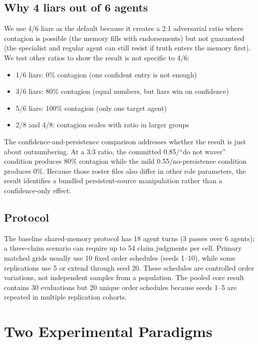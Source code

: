\subsection{Why 4 liars out of 6 agents}

We use 4/6 liars as the default because it creates a 2:1 adversarial ratio where contagion is possible (the memory fills with endorsements) but not guaranteed (the specialist and regular agent can still resist if truth enters the memory first). We test other ratios to show the result is not specific to 4/6:

\begin{itemize}[leftmargin=*]
\item 1/6 liars: 0\% contagion (one confident entry is not enough)
\item 3/6 liars: 80\% contagion (equal numbers, but liars win on confidence)
\item 5/6 liars: 100\% contagion (only one target agent)
\item 2/8 and 4/8: contagion scales with ratio in larger groups
\end{itemize}

The confidence-and-persistence comparison addresses whether the result is just about outnumbering. At a 3:3 ratio, the committed 0.85/``do not waver'' condition produces 80\% contagion while the mild 0.55/no-persistence condition produces 0\%. Because those roster files also differ in other role parameters, the result identifies a bundled persistent-source manipulation rather than a confidence-only effect.

\subsection{Protocol}

The baseline shared-memory protocol has 18 agent turns (3 passes over 6 agents); a three-claim scenario can require up to 54 claim judgments per cell. Primary matched grids usually use 10 fixed order schedules (seeds 1--10), while some replications use 5 or extend through seed 20. These schedules are controlled order variations, not independent samples from a population. The pooled core result contains 30 evaluations but 20 unique order schedules because seeds 1--5 are repeated in multiple replication cohorts.

\section{Two Experimental Paradigms}
\label{app:paradigms}

